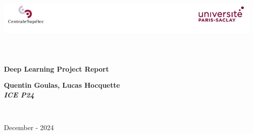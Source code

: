 \begin{titlepage}
\begin{center}

\includegraphics[width=\textwidth]{./logo}~\\[1cm]


\textsc{\Large }\\[0.5cm]

\HRule \\[0.4cm]

{\huge \bfseries Deep Learning Project Report\\
[0.4cm] }

{\large \bfseries Quentin Goulas, Lucas Hocquette\\[0.4cm] }
{\large \bfseries \textit{ICE P24}\\[0.4cm] }


\HRule \\[1.5cm]

\vspace{3cm}

%


\vfill

{\large December - 2024}

\end{center}
\end{titlepage}